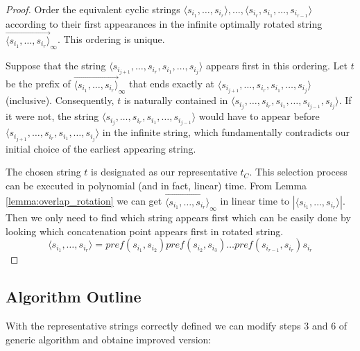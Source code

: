 \begin{proof}
Order the equivalent cyclic strings $\langle s_{i_1}, \dots, s_{i_r} \rangle,
\dots, \langle s_{i_r}, s_{i_1}, \dots, s_{i_{r-1}} \rangle$ according to their
first appearances in the infinite optimally rotated string
$\overrightarrow{\langle s_{i_1}, \dots, s_{i_r} \rangle}_\infty$. This ordering
is unique.

Suppose that the string $\langle s_{i_{j+1}}, \dots, s_{i_r}, s_{i_1}, \dots,
s_{i_j} \rangle$ appears first in this ordering. Let $t$ be the prefix of
$\overrightarrow{\langle s_{i_1}, \dots, s_{i_r} \rangle}_\infty$ that ends
exactly at $\langle s_{i_{j+1}}, \dots, s_{i_r}, s_{i_1}, \dots, s_{i_j}
\rangle$ (inclusive). Consequently, $t$ is naturally contained in $\langle
s_{i_j}, \dots, s_{i_r}, s_{i_1}, \dots, s_{i_{j-1}}, s_{i_j} \rangle$. If it
were not, the string $\langle s_{i_j}, \dots, s_{i_r}, s_{i_1}, \dots,
s_{i_{j-1}} \rangle$ would have to appear before $\langle s_{i_{j+1}}, \dots,
s_{i_r}, s_{i_1}, \dots, s_{i_j} \rangle$ in the infinite string, which
fundamentally contradicts our initial choice of the earliest appearing string.

The chosen string $t$ is designated as our representative $t_C$. This selection
process can be executed in polynomial (and in fact, linear) time. From Lemma
\ref{lemma:overlap_rotation} we can get $\overrightarrow{\langle s_{i_1}, \dots,
s_{i_r} \rangle}_\infty$ in linear time to $|\langle s_{i_1}, \dots, s_{i_r}
\rangle|$. Then we only need to find which string appears first which can be
easily done by looking which concatenation point appears first in rotated
string.
$$
\langle s_{i_1}, \dots, s_{i_r} \rangle = \textit{pref}(s_{i_1}, s_{i_2})
\textit{pref}(s_{i_2}, s_{i_3}) \dots \textit{pref}(s_{i_{r-1}}, s_{i_r})
s_{i_r}
$$
\end{proof}

\subsection{Algorithm Outline}
With the representative strings correctly defined we can modify steps 3 and 6 of
generic algorithm and obtaine improved version:

